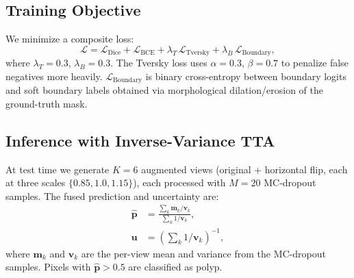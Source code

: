 \subsection{Training Objective}
\label{subsec:losses}

We minimize a composite loss:
\begin{equation}
    \mathcal{L} = \mathcal{L}_\text{Dice} + \mathcal{L}_\text{BCE}
                + \lambda_T\,\mathcal{L}_\text{Tversky}
                + \lambda_B\,\mathcal{L}_\text{Boundary},
\end{equation}
where $\lambda_T{=}0.3$, $\lambda_B{=}0.3$. The Tversky loss uses $\alpha{=}0.3$,
$\beta{=}0.7$ to penalize false negatives more heavily. $\mathcal{L}_\text{Boundary}$
is binary cross-entropy between boundary logits and soft boundary labels obtained
via morphological dilation/erosion of the ground-truth mask.

\subsection{Inference with Inverse-Variance TTA}
\label{subsec:tta}

At test time we generate $K{=}6$ augmented views (original $+$ horizontal flip,
each at three scales $\{0.85, 1.0, 1.15\}$), each processed with $M{=}20$
MC-dropout samples. The fused prediction and uncertainty are:
\begin{align}
    \hat{\bm{p}} &= \frac{\sum_k \bm{m}_k / \bm{v}_k}{\sum_k 1 / \bm{v}_k}, \\
    \bm{u}       &= \left(\sum_k 1 / \bm{v}_k\right)^{-1},
\end{align}
where $\bm{m}_k$ and $\bm{v}_k$ are the per-view mean and variance from the
MC-dropout samples. Pixels with $\hat{\bm{p}} > 0.5$ are classified as polyp.
